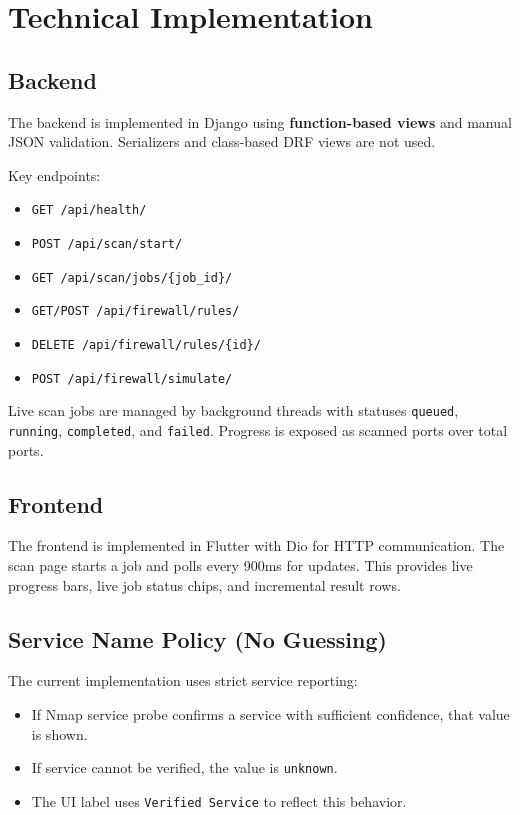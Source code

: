 \documentclass[12pt,a4paper]{article}
\begin{document}
\section{Technical Implementation}
\subsection{Backend}
The backend is implemented in Django using \textbf{function-based views} and manual JSON validation. Serializers and class-based DRF views are not used.

Key endpoints:
\begin{itemize}[leftmargin=*]
  \item \texttt{GET /api/health/}
  \item \texttt{POST /api/scan/start/}
  \item \texttt{GET /api/scan/jobs/\{job\_id\}/}
  \item \texttt{GET/POST /api/firewall/rules/}
  \item \texttt{DELETE /api/firewall/rules/\{id\}/}
  \item \texttt{POST /api/firewall/simulate/}
\end{itemize}

Live scan jobs are managed by background threads with statuses \texttt{queued}, \texttt{running}, \texttt{completed}, and \texttt{failed}. Progress is exposed as scanned ports over total ports.

\subsection{Frontend}
The frontend is implemented in Flutter with Dio for HTTP communication. The scan page starts a job and polls every 900ms for updates. This provides live progress bars, live job status chips, and incremental result rows.

\subsection{Service Name Policy (No Guessing)}
The current implementation uses strict service reporting:
\begin{itemize}[leftmargin=*]
  \item If Nmap service probe confirms a service with sufficient confidence, that value is shown.
  \item If service cannot be verified, the value is \texttt{unknown}.
  \item The UI label uses \texttt{Verified Service} to reflect this behavior.
\end{itemize}
\end{document}
